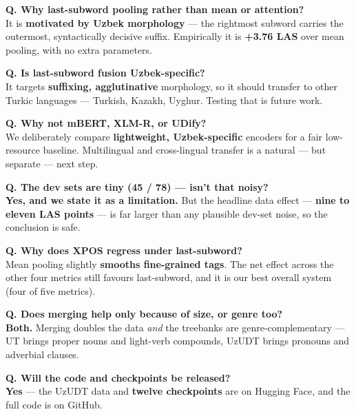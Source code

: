 \documentclass[12pt,a4paper]{article}
\begin{document}
\vspace{0.4em}
\noindent\textbf{Q. Why last-subword pooling rather than mean or attention?}\\
It is \textbf{motivated by Uzbek morphology} --- the rightmost subword
carries the outermost, syntactically decisive suffix. Empirically it is
\textbf{+3.76 LAS} over mean pooling, with no extra parameters.

\vspace{0.4em}
\noindent\textbf{Q. Is last-subword fusion Uzbek-specific?}\\
It targets \textbf{suffixing, agglutinative} morphology, so it should
transfer to other Turkic languages --- Turkish, Kazakh, Uyghur. Testing
that is future work.

\vspace{0.4em}
\noindent\textbf{Q. Why not mBERT, XLM-R, or UDify?}\\
We deliberately compare \textbf{lightweight, Uzbek-specific} encoders for
a fair low-resource baseline. Multilingual and cross-lingual transfer is
a natural --- but separate --- next step.

\vspace{0.4em}
\noindent\textbf{Q. The dev sets are tiny (45 / 78) --- isn't that noisy?}\\
\textbf{Yes, and we state it as a limitation.} But the headline data
effect --- \textbf{nine to eleven LAS points} --- is far larger than any
plausible dev-set noise, so the conclusion is safe.

\vspace{0.4em}
\noindent\textbf{Q. Why does XPOS regress under last-subword?}\\
Mean pooling slightly \textbf{smooths fine-grained tags}. The net effect
across the other four metrics still favours last-subword, and it is our
best overall system (four of five metrics).

\vspace{0.4em}
\noindent\textbf{Q. Does merging help only because of size, or genre too?}\\
\textbf{Both.} Merging doubles the data \emph{and} the treebanks are
genre-complementary --- UT brings proper nouns and light-verb compounds,
UzUDT brings pronouns and adverbial clauses.

\vspace{0.4em}
\noindent\textbf{Q. Will the code and checkpoints be released?}\\
\textbf{Yes} --- the UzUDT data and \textbf{twelve checkpoints} are on
Hugging Face, and the full code is on GitHub.
\end{document}
